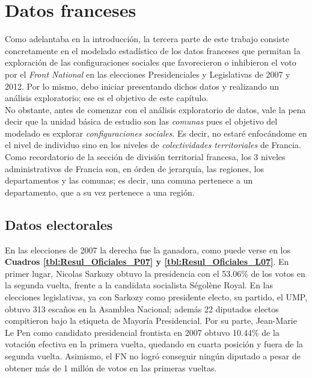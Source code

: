 \chapter{Datos franceses}

Como adelantaba en la introducción, la tercera parte de este trabajo consiste concretamente en el modelado estadístico de los datos franceses que permitan la exploración de las configuraciones sociales que favorecieron o inhibieron el voto por el \textit{Front National} en las elecciones Presidenciales y Legislativas de 2007 y 2012. Por lo mismo, debo iniciar presentando dichos datos y realizando un análisis exploratorio; ese es el objetivo de este capítulo.\\

No obstante, antes de comenzar con el análisis exploratorio de datos, vale la pena decir que la unidad básica de estudio son las \textit{comunas} pues el objetivo del modelado es explorar \textit{configuraciones sociales}. Es decir, no estaré enfocándome en el nivel de individuo sino en los niveles de \textit{colectividades territoriales} de Francia. Como recordatorio de la {\color{Red} sección de división territorial francesa}, los 3 niveles administrativos de Francia son, en órden de jerarquía, las regiones, los departamentos y las comunas; es decir, una comuna pertenece a un departamento, que a su vez pertenece a una región.\\ 

\section{Datos electorales}

En las elecciones de 2007 la derecha fue la ganadora, como puede verse en los \textbf{Cuadros \ref{tbl:Resul_Oficiales_P07} y \ref{tbl:Resul_Oficiales_L07}}. En primer lugar, Nicolas Sarkozy obtuvo la presidencia con el 53.06\% de los votos en la segunda vuelta, frente a la candidata socialista Ségolène Royal. En las elecciones legislativas, ya con Sarkozy como presidente electo, su partido, el UMP, obtuvo 313 escaños en la Asamblea Nacional; además 22 diputados electos compitieron bajo la etiqueta de Mayoría Presidencial. Por su parte, Jean-Marie Le Pen como candidato presidencial frontista en 2007 obtuvo 10.44\% de la votación efectiva en la primera vuelta, quedando en cuarta posición y fuera de la segunda vuelta. Asimismo, el FN no logró conseguir ningún diputado a pesar de obtener más de 1 millón de votos en las primeras vueltas.\\ 

